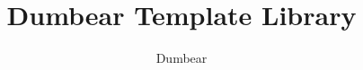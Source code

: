 \documentclass[a4paper,twocolumn]{article}
\title{Dumbear Template Library}
\author{Dumbear}
\begin{document}
\begin{titlepage}
\maketitle
\end{titlepage}

\tableofcontents

\clearpage






\end{document}
